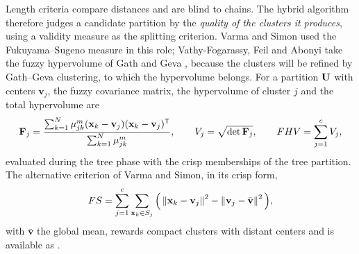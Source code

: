 Length criteria compare distances and are blind to chains. The hybrid algorithm therefore judges a candidate partition by the \emph{quality of the clusters it produces}, using a validity measure as the splitting criterion. Varma and Simon \cite{varma:2004:mst} used the Fukuyama--Sugeno measure \cite{fukuyama:1989:validity} in this role; Vathy-Fogarassy, Feil and Abonyi take the fuzzy hypervolume of Gath and Geva \cite{gath:1989}, because the clusters will be refined by Gath--Geva clustering, to which the hypervolume belongs. For a partition $\mathbf{U}$ with centers $\mathbf{v}_j$, the fuzzy covariance matrix, the hypervolume of cluster $j$ and the total hypervolume are
\begin{equation}
  \mathbf{F}_j=\frac{\sum_{k=1}^{N}\mu_{jk}^m(\mathbf{x}_k-\mathbf{v}_j)(\mathbf{x}_k-\mathbf{v}_j)^{\mathsf{T}}}{\sum_{k=1}^{N}\mu_{jk}^m},\qquad
  V_j=\sqrt{\det\mathbf{F}_j},\qquad
  FHV=\sum_{j=1}^{c}V_j ,
  \label{eq:graph:fhv}
\end{equation}
evaluated during the tree phase with the crisp memberships of the tree partition. The alternative criterion of Varma and Simon, in its crisp form,
\begin{equation}
  FS=\sum_{j=1}^{c}\sum_{\mathbf{x}_k\in S_j}\Big(\left\lVert \mathbf{x}_k-\mathbf{v}_j \right\rVert^2-\left\lVert \mathbf{v}_j-\bar{\mathbf{v}} \right\rVert^2\Big),
  \label{eq:graph:fs}
\end{equation}
with $\bar{\mathbf{v}}$ the global mean, rewards compact clusters with distant centers and is available as .

